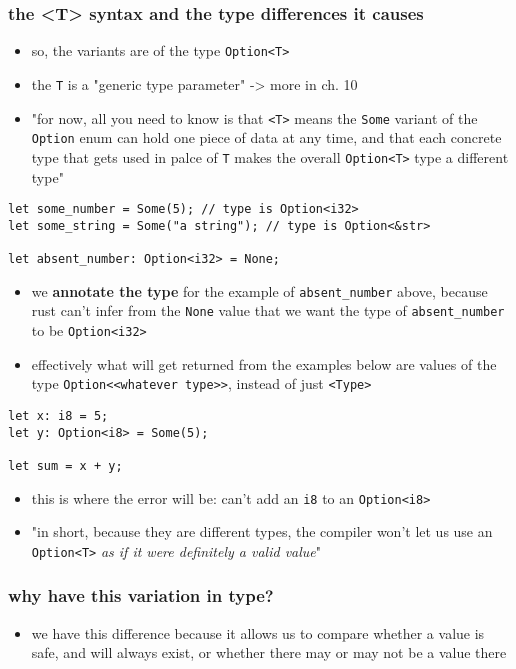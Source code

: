 \documentclass[11pt]{article}
\begin{document}
\subsubsection{the <T> syntax and the type differences it causes}
\label{sec:org1b6c3ea}
\begin{itemize}
\item so, the variants are of the type \texttt{Option<T>}
\item the \texttt{T} is a "generic type parameter" -> more in ch. 10
\item "for now, all you need to know is that \texttt{<T>} means the \texttt{Some} variant of the \texttt{Option} enum can hold one piece of data at any time, and that each concrete type that gets used in palce of \texttt{T} makes the overall \texttt{Option<T>} type a different type"
\end{itemize}
\begin{verbatim}
let some_number = Some(5); // type is Option<i32>
let some_string = Some("a string"); // type is Option<&str>

let absent_number: Option<i32> = None; 
\end{verbatim}
\begin{itemize}
\item we \textbf{annotate the type} for the example of \texttt{absent\_number} above, because rust can't infer from the \texttt{None} value that we want the type of \texttt{absent\_number} to be \texttt{Option<i32>}
\item effectively what will get returned from the examples below are values of the type \texttt{Option<<whatever type>>}, instead of just \texttt{<Type>}
\end{itemize}

\begin{verbatim}
let x: i8 = 5;
let y: Option<i8> = Some(5);

let sum = x + y;
\end{verbatim}
\begin{itemize}
\item this is where the error will be: can't add an \texttt{i8} to an \texttt{Option<i8>}
\item "in short, because they are different types, the compiler won't let us use an \texttt{Option<T>} \emph{as if it were definitely a valid value}"
\end{itemize}
\subsubsection{why have this variation in type?}
\label{sec:org11af394}
\begin{itemize}
\item we have this difference because it allows us to compare whether a value is safe, and will always exist, or whether there may or may not be a value there
\end{itemize}
\end{document}
